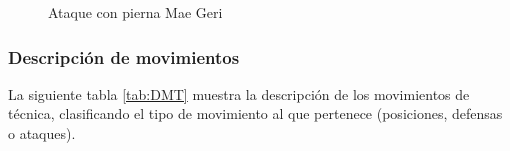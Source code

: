 \begin{figure}[H]
	\centering
	\caption{Ataque con pierna Mae Geri}
	\label{fig:Ataques2}
\end{figure}

\clearpage
\subsubsection{Descripción de movimientos}
La siguiente tabla \ref{tab:DMT}  muestra la descripción de los movimientos de técnica, clasificando el tipo de movimiento al que pertenece (posiciones, defensas o ataques).

